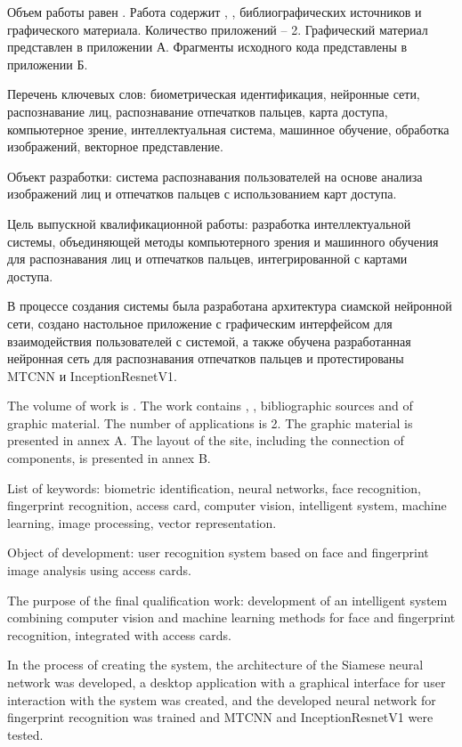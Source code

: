 
Объем работы равен . Работа содержит , ,  библиографических источников и  графического материала. Количество приложений – 2. Графический материал представлен в приложении А. Фрагменты исходного кода представлены в приложении Б.

Перечень ключевых слов: биометрическая идентификация, нейронные сети, распознавание лиц, распознавание отпечатков пальцев, карта доступа, компьютерное зрение, интеллектуальная система, машинное обучение, обработка изображений, векторное представление.

Объект разработки: система распознавания пользователей на основе анализа изображений лиц и отпечатков пальцев с использованием карт доступа.

Цель выпускной квалификационной работы: разработка интеллектуальной системы, объединяющей методы компьютерного зрения и машинного обучения для распознавания лиц и отпечатков пальцев, интегрированной с картами доступа.

В процессе создания системы была разработана архитектура сиамской нейронной сети, создано настольное приложение с графическим интерфейсом для взаимодействия пользователей с системой, а также обучена разработанная нейронная сеть для распознавания отпечатков пальцев и протестированы MTCNN и InceptionResnetV1.

  
The volume of work is . The work contains , ,  bibliographic sources and  of graphic material. The number of applications is 2. The graphic material is presented in annex A. The layout of the site, including the connection of components, is presented in annex B.

List of keywords: biometric identification, neural networks, face recognition, fingerprint recognition, access card, computer vision, intelligent system, machine learning, image processing, vector representation.

Object of development: user recognition system based on face and fingerprint image analysis using access cards.

The purpose of the final qualification work: development of an intelligent system combining computer vision and machine learning methods for face and fingerprint recognition, integrated with access cards.

In the process of creating the system, the architecture of the Siamese neural network was developed, a desktop application with a graphical interface for user interaction with the system was created, and the developed neural network for fingerprint recognition was trained and MTCNN and InceptionResnetV1 were tested.
